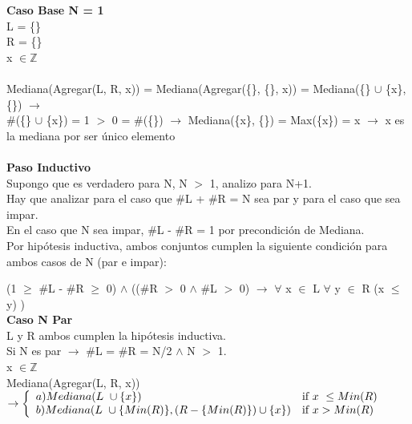 \documentclass{article}
\theoremstyle{definition}
\theoremstyle{remark}
\begin{document}
\textbf{Caso Base N = 1} \\

L = \{\} \\  

R = \{\} \\ 

x $\in \mathds{Z}$ \\ \\

Mediana(Agregar(L, R, x)) = 
Mediana(Agregar(\{\}, \{\}, x)) =
Mediana(\{\} $\cup$ \{x\}, \{\}) $\rightarrow$ \\ 
\#(\{\} $\cup$ \{x\}) = 1 $>$ 0 = \#(\{\}) $\rightarrow$
Mediana(\{x\}, \{\}) = Max(\{x\}) = x $\rightarrow$ x es la mediana por ser único elemento \\ \\

\textbf{Paso Inductivo} \\

Supongo que es verdadero para N, N $>$ 1, analizo para N+1.\\

Hay que analizar para el caso que \#L + \#R = N sea par y para el caso que sea impar. \\

En el caso que N sea impar, \#L - \#R = 1 por precondición de Mediana. \\

Por hipótesis inductiva, ambos conjuntos cumplen la siguiente condición para ambos casos de N (par e impar): 

(1 $\geq$ \#L - \#R $\geq$ 0) $\wedge$ ((\#R $>$ 0 $\wedge$ \#L $>$ 0) $\rightarrow$ $\forall$ x $\in$ L $\forall$ y $\in$ R (x $\leq$ y) ) \\

\textbf{Caso N Par}\\ 

L y R ambos cumplen la hipótesis inductiva.\\

Si N es par $\rightarrow$ \#L = \#R = N/2 $\wedge$ N $>$ 1.\\ 

x $\in \mathds{Z}$ \\

Mediana(Agregar(L, R, x)) $\rightarrow \twopartdef{ a) Mediana(L \ \cup \{x\})}
                                                        {x \ \leq Min(R)}
                                                    {b) Mediana(L  \ \cup \{Min(R)\}, (R - \{Min(R)\}) \cup \{x\})}
                                                        {x > Min(R)}$\\
                                                        
\end{document}
